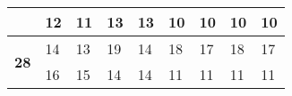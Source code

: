 \begin{table}[!htbp]
{\begin{tabular}{|c|ll|ll|ll|ll|}
                                 & \multicolumn{1}{l|}{12}                                                                                 & 11                                                                                                   & \multicolumn{1}{l|}{13}                                                                                 & 13                                                                                                   & \multicolumn{1}{l|}{10}                                                                                 & 10                                                                                                   & \multicolumn{1}{l|}{10}                                                                                 & 10                                                                                                   \\ \hline
\multirow{2}{*}{\textbf{28}}     & \multicolumn{1}{l|}{14}                                                                                 & 13                                                                                                   & \multicolumn{1}{l|}{19}                                                                                 & 14                                                                                                   & \multicolumn{1}{l|}{18}                                                                                 & 17                                                                                                   & \multicolumn{1}{l|}{18}                                                                                 & 17                                                                                                   \\ \cline{2-9} 
                                 & \multicolumn{1}{l|}{16}                                                                                 & 15                                                                                                   & \multicolumn{1}{l|}{14}                                                                                 & 14                                                                                                   & \multicolumn{1}{l|}{11}                                                                                 & 11                                                                                                   & \multicolumn{1}{l|}{11}                                                                                 & 11                                                                                                   \\ \hline

\end{tabular}}
\end{table}
